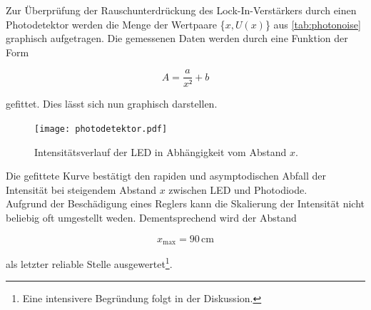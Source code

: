 Zur Überprüfung der Rauschunterdrückung des Lock-In-Verstärkers durch einen Photodetektor werden die Menge der Wertpaare
\{$x,U(x)$\} aus \autoref{tab:photonoise} graphisch aufgetragen. Die gemessenen Daten werden durch eine Funktion der Form

\begin{equation*}
    A = \frac{a}{x²} + b
\end{equation*}

\noindent gefittet. Dies lässt sich nun graphisch darstellen.

\begin{figure}
    \centering
    \texttt{[image: photodetektor.pdf]}
    \caption{Intensitätsverlauf der LED in Abhängigkeit vom Abstand $x$.}
    \label{fig:photoabb}
\end{figure}

\noindent Die gefittete Kurve bestätigt den rapiden und asymptodischen Abfall der Intensität bei steigendem
Abstand $x$ zwischen LED und Photodiode.\\
Aufgrund der Beschädigung eines Reglers kann die Skalierung der Intensität nicht beliebig oft umgestellt weden. 
Dementsprechend wird der Abstand 

\begin{equation*}
    x_\text{max} = 90\,\unit{\centi\meter}
\end{equation*}

\noindent als letzter reliable Stelle ausgewertet\footnote{Eine intensivere Begründung folgt in der Diskussion.}.
%
